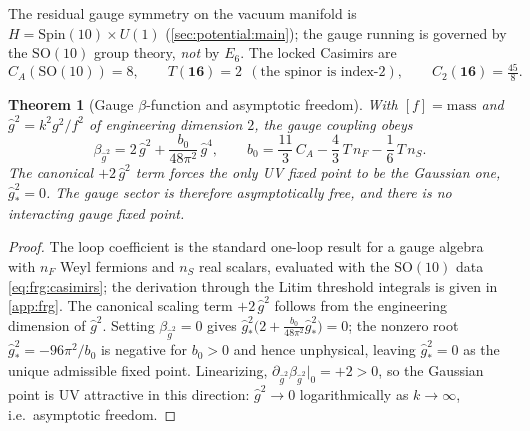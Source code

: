 \documentclass[11pt]{article}
\theoremstyle{plain}
\newtheorem{theorem}{Theorem}[section]
\theoremstyle{definition}
\theoremstyle{remark}
\begin{document}
The residual gauge symmetry on the vacuum manifold is $H=\mathrm{Spin}(10)\times U(1)$
(\autoref{sec:potential:main}); the gauge running is governed by the
\emph{$\mathrm{SO}(10)$} group theory, \emph{not} by $E_{6}$. The locked
Casimirs are
\begin{equation}\label{eq:frg:casimirs}
  C_{A}\!\left(\mathrm{SO}(10)\right)=8,\qquad
  T(\mathbf{16})=2\ \ (\text{the spinor is index-}2),\qquad
  C_{2}(\mathbf{16})=\tfrac{45}{8}.
\end{equation}

\begin{theorem}[Gauge $\beta$-function and asymptotic freedom]
\label{thm:frg:gauge}
With $[f]=\text{mass}$ and $\hat g^{2}=k^{2}g^{2}/f^{2}$ of engineering
dimension $2$, the gauge coupling obeys
\begin{equation}\label{eq:frg:betag}
  \beta_{\hat g^{2}}
  = 2\,\hat g^{2}
    + \frac{b_{0}}{48\pi^{2}}\,\hat g^{4},
  \qquad
  b_{0}=\frac{11}{3}\,C_{A}-\frac{4}{3}\,T\,n_{F}-\frac16\,T\,n_{S}.
\end{equation}
The canonical $+2\,\hat g^{2}$ term forces the only UV fixed point to be
the \emph{Gaussian} one, $\hat g^{2}_{\ast}=0$. The gauge sector is
therefore asymptotically free, and there is no interacting gauge fixed
point.
\end{theorem}

\begin{proof}
The loop coefficient is the standard one-loop result for a gauge algebra
with $n_{F}$ Weyl fermions and $n_{S}$ real scalars, evaluated with the
$\mathrm{SO}(10)$ data \eqref{eq:frg:casimirs}; the derivation through the
Litim threshold integrals is given in \autoref{app:frg}. The canonical
scaling term $+2\,\hat g^{2}$ follows from the engineering dimension of
$\hat g^{2}$. Setting $\beta_{\hat g^{2}}=0$ gives
$\hat g^{2}_{\ast}\bigl(2+\tfrac{b_{0}}{48\pi^{2}}\hat g^{2}_{\ast}\bigr)=0$;
the nonzero root $\hat g^{2}_{\ast}=-96\pi^{2}/b_{0}$ is negative for
$b_{0}>0$ and hence unphysical, leaving $\hat g^{2}_{\ast}=0$ as the unique
admissible fixed point. Linearizing, $\partial_{\hat g^{2}}\beta_{\hat g^{2}}|_{0}=+2>0$,
so the Gaussian point is UV attractive in this direction: $\hat g^{2}\to0$
logarithmically as $k\to\infty$, i.e.\ asymptotic freedom.
\end{proof}
\end{document}
